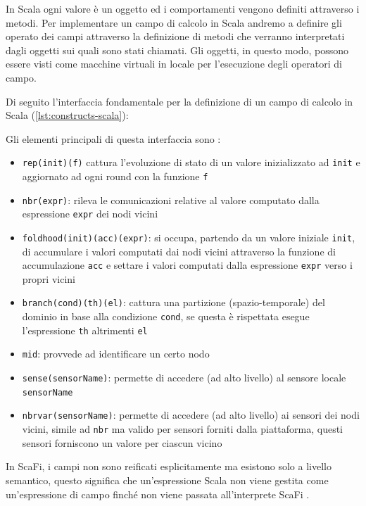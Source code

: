 \documentclass[12pt,a4paper,openright,twoside]{book}
\begin{document}
In Scala ogni valore è un oggetto ed i comportamenti vengono definiti attraverso i metodi. Per implementare un campo di calcolo in Scala andremo a definire gli operato dei campi attraverso la definizione di metodi che verranno interpretati dagli oggetti sui quali sono stati chiamati. Gli oggetti, in questo modo, possono essere visti come macchine virtuali in locale per l'esecuzione degli operatori di campo.

Di seguito l'interfaccia fondamentale per la definizione di un campo di calcolo in Scala (\cref{lst:constructs-scala}):



Gli elementi principali di questa interfaccia sono \cite{Casadei2022}:
\begin{itemize}
    \item \verb|rep(init)(f)| cattura l'evoluzione di stato di un valore inizializzato ad \verb|init| e aggiornato ad ogni round con la funzione \verb|f|
    \item \verb|nbr(expr)|: rileva le comunicazioni relative al valore computato dalla espressione \verb|expr| dei nodi vicini
    \item \verb|foldhood(init)(acc)(expr)|: si occupa, partendo da un valore iniziale \verb|init|, di accumulare i valori computati dai nodi vicini attraverso la funzione di accumulazione \verb|acc| e settare i valori computati dalla espressione \verb|expr| verso i propri vicini
    \item \verb|branch(cond)(th)(el)|: cattura una partizione (spazio-temporale) del dominio in base alla condizione \verb|cond|, se questa è rispettata esegue l'espressione \verb|th| altrimenti \verb|el|
    \item \verb|mid|: provvede ad identificare un certo nodo
    \item \verb|sense(sensorName)|: permette di accedere (ad alto livello) al sensore locale \verb|sensorName|
    \item \verb|nbrvar(sensorName)|: permette di accedere (ad alto livello) ai sensori dei nodi vicini, simile ad \verb|nbr| ma valido per sensori forniti dalla piattaforma, questi sensori forniscono un valore per ciascun vicino
\end{itemize}

In ScaFi, i campi non sono reificati esplicitamente ma esistono solo a livello semantico, questo significa che un'espressione Scala non viene gestita come un'espressione di campo finché non viene passata all'interprete ScaFi \cite{CasadeiPhDThesis}.
\end{document}
